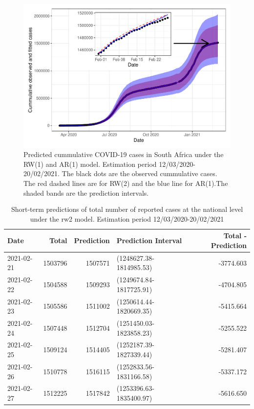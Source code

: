 \documentclass[10pt,letterpaper]{article}
\begin{document}
\begin{figure}[H]
\includegraphics[width=0.95\linewidth]{COVIDincidenceSA_files/figure-latex/predd-1} \caption{Predicted cummulative COVID-19 cases in South Africa under the RW(1) and AR(1) model. Estimation period 12/03/2020-20/02/2021. The black dots are the observed cummulative cases. The red dashed lines are for RW(2) and the blue line for AR(1).The shaded bands are the prediction intervals. }\label{fig:predd}
\end{figure}

\begin{table}[!h]

\caption{\label{tab:unnamed-chunk-10}Short-term predictions of total number of reported cases at the national level under the rw2 model. Estimation period 12/03/2020-20/02/2021}
\centering
\begin{tabular}[t]{l|r|r|l|r}
\hline
Date & Total & Prediction & Prediction Interval & Total - Prediction\\
\hline
2021-02-21 & 1503796 & 1507571 & (1248627.38-1814985.53) & -3774.603\\
\hline
2021-02-22 & 1504588 & 1509293 & (1249674.84-1817725.91) & -4704.805\\
\hline
2021-02-23 & 1505586 & 1511002 & (1250614.44-1820669.35) & -5415.664\\
\hline
2021-02-24 & 1507448 & 1512704 & (1251450.03-1823858.23) & -5255.522\\
\hline
2021-02-25 & 1509124 & 1514405 & (1252187.39-1827339.44) & -5281.407\\
\hline
2021-02-26 & 1510778 & 1516115 & (1252833.56-1831166.58) & -5337.172\\
\hline
2021-02-27 & 1512225 & 1517842 & (1253396.63-1835400.97) & -5616.650\\
\hline
\end{tabular}
\end{table}
\end{document}
